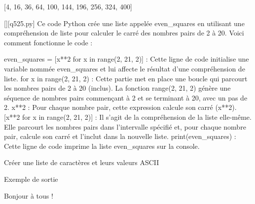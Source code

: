 [4, 16, 36, 64, 100, 144, 196, 256, 324, 400]
        \par
        \begin{solution}
            \renewcommand{\nomfichier}{q525.py}
            \pythonfile{\chemincode \nomfichier}[][\nomfichier]
            Ce code Python crée une liste appelée even_squares en utilisant une compréhension de liste pour calculer le carré des nombres pairs de 2 à 20. Voici comment fonctionne le code :

    even_squares = [x**2 for x in range(2, 21, 2)] : Cette ligne de code initialise une variable nommée even_squares et lui affecte le résultat d'une compréhension de liste.
        for x in range(2, 21, 2) : Cette partie met en place une boucle qui parcourt les nombres pairs de 2 à 20 (inclus). La fonction range(2, 21, 2) génère une séquence de nombres pairs commençant à 2 et se terminant à 20, avec un pas de 2.
        x**2 : Pour chaque nombre pair, cette expression calcule son carré (x**2).
        [x**2 for x in range(2, 21, 2)] : Il s'agit de la compréhension de la liste elle-même. Elle parcourt les nombres pairs dans l'intervalle spécifié et, pour chaque nombre pair, calcule son carré et l'inclut dans la nouvelle liste.
    print(even_squares) : Cette ligne de code imprime la liste even_squares sur la console.
        \end{solution}
        

        \question
        Créer une liste de caractères et leurs valeurs ASCII

Exemple de sortie

Bonjour à tous !

